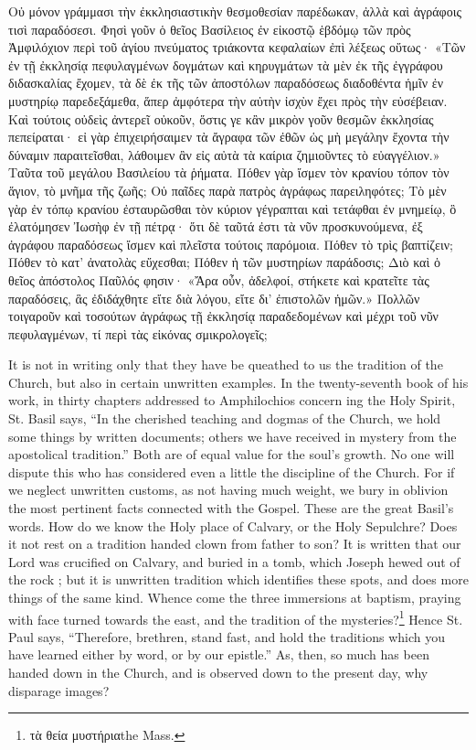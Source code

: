 \documentclass[10pt]{book}
\newcommand{\switchGreek}[1][]{\selectlanguage{polutonikogreek} \switchcolumn*[#1]}
\newcommand{\switchEnglish}{\selectlanguage{english} \switchcolumn}
\begin{document}
\begin{paracol}{2}
\switchGreek

Οὐ μόνον γράμμασι τὴν ἐκκλησιαστικὴν θεσμοθεσίαν παρέδωκαν, ἀλλὰ καὶ ἀγράφοις τισὶ παραδόσεσι.
Φησὶ γοῦν ὁ θεῖος Βασίλειος ἐν εἰκοστῷ ἑβδόμῳ τῶν πρὸς Ἀμφιλόχιον περὶ τοῦ ἁγίου πνεύματος τριάκοντα κεφαλαίων ἐπὶ λέξεως οὕτως· «Τῶν ἐν τῇ ἐκκλησίᾳ πεφυλαγμένων δογμάτων καὶ κηρυγμάτων τὰ μὲν ἐκ τῆς ἐγγράφου διδασκαλίας ἔχομεν, τὰ δὲ ἐκ τῆς τῶν ἀποστόλων παραδόσεως διαδοθέντα ἡμῖν ἐν μυστηρίῳ παρεδεξάμεθα, ἅπερ ἀμφότερα τὴν αὐτὴν ἰσχὺν ἔχει πρὸς τὴν εὐσέβειαν.
Καὶ τούτοις οὐδεὶς ἀντερεῖ οὐκοῦν, ὅστις γε κἂν μικρὸν γοῦν θεσμῶν ἐκκλησίας πεπείραται· εἰ γὰρ ἐπιχειρήσαιμεν τὰ ἄγραφα τῶν ἐθῶν ὡς μὴ μεγάλην ἔχοντα τὴν δύναμιν παραιτεῖσθαι, λάθοιμεν ἂν εἰς αὐτὰ τὰ καίρια ζημιοῦντες τὸ εὐαγγέλιον.» Ταῦτα τοῦ μεγάλου Βασιλείου τὰ ῥήματα.
Πόθεν γὰρ ἴσμεν τὸν κρανίου τόπον τὸν ἅγιον, τὸ μνῆμα τῆς ζωῆς; Οὐ παῖδες παρὰ πατρὸς ἀγράφως παρειληφότες; Τὸ μὲν γὰρ ἐν τόπῳ κρανίου ἐσταυρῶσθαι τὸν κύριον γέγραπται καὶ τετάφθαι ἐν μνημείῳ, ὃ ἐλατόμησεν Ἰωσὴφ ἐν τῇ πέτρᾳ· ὅτι δὲ ταῦτά ἐστι τὰ νῦν προσκυνούμενα, ἐξ ἀγράφου παραδόσεως ἴσμεν καὶ πλεῖστα τούτοις παρόμοια.
Πόθεν τὸ τρὶς βαπτίζειν; Πόθεν τὸ κατ’ ἀνατολὰς εὔχεσθαι; Πόθεν ἡ τῶν μυστηρίων παράδοσις; Διὸ καὶ ὁ θεῖος ἀπόστολος Παῦλός φησιν· «Ἄρα οὖν, ἀδελφοί, στήκετε καὶ κρατεῖτε τὰς παραδόσεις, ἃς ἐδιδάχθητε εἴτε διὰ λόγου, εἴτε δι’ ἐπιστολῶν ἡμῶν.» Πολλῶν τοιγαροῦν καὶ τοσούτων ἀγράφως τῇ ἐκκλησίᾳ παραδεδομένων καὶ μέχρι τοῦ νῦν πεφυλαγμένων, τί περὶ τὰς εἰκόνας σμικρολογεῖς;

\switchEnglish

It is not in writing only that they have be 
queathed to us the tradition of the Church, but 
also in certain unwritten examples. In the 
twenty-seventh book of his work, in thirty 
chapters addressed to Amphilochios concern 
ing the Holy Spirit, St. Basil says, ``In the 
cherished teaching and dogmas of the Church, 
we hold some things by written documents; 
others we have received in mystery from the 
apostolical tradition.'' Both are of equal value 
for the soul's growth. No one will dispute 
this who has considered even a little the discipline of the Church. For if we neglect unwritten customs, as not having much weight, 
we bury in oblivion the most pertinent facts 
connected with the Gospel. These are the 
great Basil's words. How do we know the 
Holy place of Calvary, or the Holy Sepulchre? 
Does it not rest on a tradition handed clown 
from father to son? It is written that our 
Lord was crucified on Calvary, and buried in 
a tomb, which Joseph hewed out of the rock ; 
but it is unwritten tradition which identifies 
these spots, and does more things of the same 
kind. Whence come the three immersions 
at baptism, praying with face turned towards 
the east, and the tradition of the mysteries?\footnote{τὰ θεία μυστήρια\textemdash the Mass.}
Hence St. Paul says, ``Therefore, brethren, stand 
fast, and hold the traditions which you have 
learned either by word, or by our epistle.'' As, 
then, so much has been handed down in the 
Church, and is observed down to the present 
day, why disparage images? 


\end{paracol}
\end{document}
